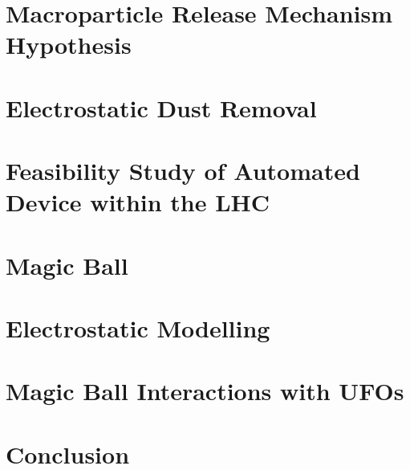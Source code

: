 \documentclass[a4paper,11pt]{report}
\begin{document}
\graphicspath{{./TomReport/}}

 
\graphicspath{{./saad/}}


\graphicspath{{./CamEadieReport/Images/}}


\graphicspath{{./TomReport/}}


\chapter{Macroparticle Release Mechanism Hypothesis}
\graphicspath{{./saad/}}


\chapter{Electrostatic Dust Removal}\label{dust_removal}
\graphicspath{{./CamEadieReport/Images/}}


\chapter{Feasibility Study of Automated Device within the LHC} \label{sec: Feasibility}
\graphicspath{{./Alexander/feasibility-study-automated/}}


\chapter{Magic Ball}\label{sec: Magic Ball - Alex}
\graphicspath{{./Alexander/magic-ball/}}


\chapter{Electrostatic Modelling}
\graphicspath{{./TomReport/}}


\chapter{Magic Ball Interactions with UFOs}
\graphicspath{{./saad/}}


\chapter{Conclusion}
\graphicspath{{./CamEadieReport/Images/}}


\clearpage
{}
\printbibliography

\end{document}
